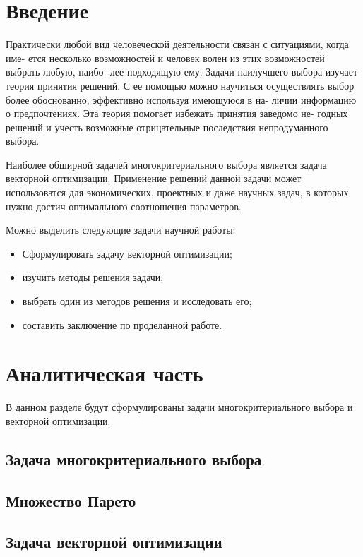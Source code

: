 \documentclass[12pt,a4paper]{report}
\begin{document}
%
\tableofcontents

\newpage
\chapter*{Введение}
Практически любой вид человеческой деятельности связан с ситуациями, когда име-
ется несколько возможностей и человек волен из этих возможностей выбрать любую, наибо-
лее подходящую ему.
Задачи наилучшего выбора изучает теория принятия решений. С ее помощью можно
научиться осуществлять выбор более обоснованно, эффективно используя имеющуюся в на-
личии информацию о предпочтениях. Эта теория помогает избежать принятия заведомо не-
годных решений и учесть возможные отрицательные последствия непродуманного выбора.

Наиболее обширной задачей многокритериального выбора является задача векторной оптимизации. Применение решений данной задачи может использоватся для экономических, проектных и даже научных задач, в которых нужно достич оптимального соотношения параметров.



Можно выделить следующие задачи научной работы:
\begin{itemize}
    \item Сформулировать задачу векторной оптимизации;
    \item изучить методы решения задачи;
    \item выбрать один из методов решения и исследовать его;
    \item составить заключение по проделанной работе.
\end{itemize}

\newpage
\chapter{Аналитическая часть}
В данном разделе будут сформулированы задачи многокритериального выбора и векторной оптимизации.
\section{Задача многокритериального выбора}
\section{Множество Парето}
\section{Задача векторной оптимизации}
\end{document}
